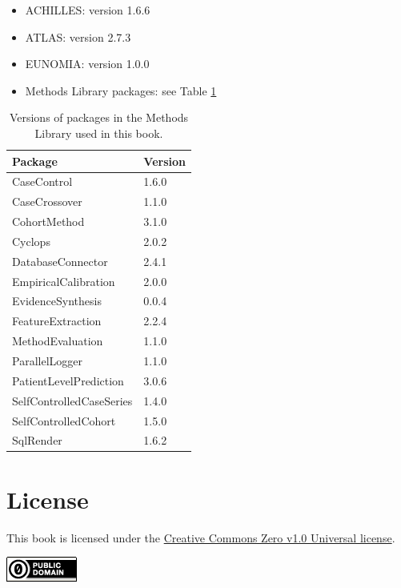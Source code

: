 \documentclass[11pt]{book}
\providecommand{\tightlist}{%
  \setlength{\itemsep}{0pt}\setlength{\parskip}{0pt}}
\theoremstyle{definition}
\theoremstyle{definition}
\theoremstyle{definition}
\theoremstyle{remark}
\begin{document}
\begin{itemize}
\tightlist
\item
  ACHILLES: version 1.6.6
\item
  ATLAS: version 2.7.3
\item
  EUNOMIA: version 1.0.0
\item
  Methods Library packages: see Table \ref{tab:packageVersions}
\end{itemize}

\begin{table}[t]

\caption{\label{tab:packageVersions}Versions of packages in the Methods Library used in this book.}
\centering
\begin{tabular}{ll}
\toprule
Package & Version\\
\midrule
CaseControl & 1.6.0\\
CaseCrossover & 1.1.0\\
CohortMethod & 3.1.0\\
Cyclops & 2.0.2\\
DatabaseConnector & 2.4.1\\
\addlinespace
EmpiricalCalibration & 2.0.0\\
EvidenceSynthesis & 0.0.4\\
FeatureExtraction & 2.2.4\\
MethodEvaluation & 1.1.0\\
ParallelLogger & 1.1.0\\
\addlinespace
PatientLevelPrediction & 3.0.6\\
SelfControlledCaseSeries & 1.4.0\\
SelfControlledCohort & 1.5.0\\
SqlRender & 1.6.2\\
\bottomrule
\end{tabular}
\end{table}

\hypertarget{license}{%
\section*{License}\label{license}}

This book is licensed under the \href{http://creativecommons.org/publicdomain/zero/1.0/}{Creative Commons Zero v1.0 Universal license}.

\includegraphics{images/Preface/cc0.png}
\end{document}
